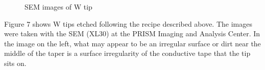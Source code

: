 \documentclass[11pt]{article}
\numberwithin{equation}{section}
\begin{document}
\begin{figure}%
    \centering
    \qquad
    \caption{SEM images of W tip}%
    \label{fig:example}%
\end{figure}

Figure 7 shows W tips etched following the recipe described above. The images were taken with the SEM (XL30) at the PRISM Imaging and Analysis Center.  In the image on the left, what may appear to be an irregular surface or dirt near the middle of the taper is a surface irregularity of the conductive tape that the tip sits on.  \\
\end{document}
